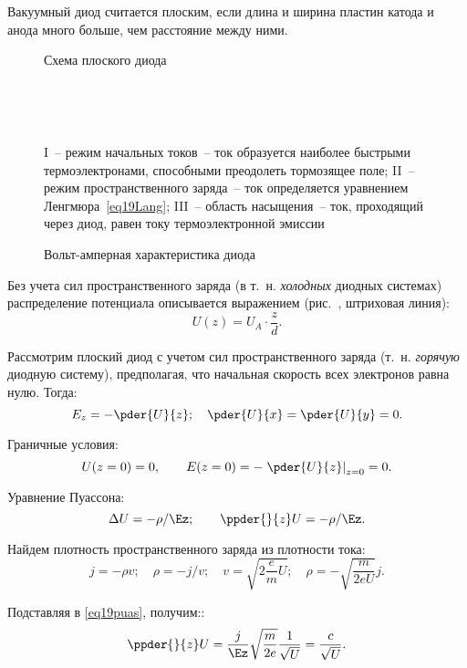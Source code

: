 
Вакуумный диод считается плоским, если длина и ширина пластин катода и анода
много больше, чем расстояние между ними.
\begin{figure}[h!]
  \center
  \parbox{.3\textwidth}{\caption{Схема плоского диода} \label{pic19diode}}
    \hspace{1em}
  \parbox{.45\textwidth}{\caption{Вольт-амперная характеристика диода}
    \label{pic19VAC}} \\
  \parbox{.35\textwidth}{\ } \hspace{1em}
  \parbox{.6\textwidth}{\footnotesize I~-- режим начальных токов~-- ток
    образуется наиболее быстрыми термоэлектронами, способными преодолеть
    тормозящее поле; II~-- режим пространственного заряда~-- ток определяется
    уравнением Ленгмюра~\eqref{eq19Lang}; III~-- область насыщения~-- ток,
    проходящий через диод, равен току термоэлектронной эмиссии}
\end{figure}

Без учета сил пространственного заряда (в т.~н. \emph{холодных} диодных
системах) распределение потенциала описывается выражением (рис.~,
штриховая линия):
\[
  U(z) = U_A \cdot \frac{z}{d}.
\]

Рассмотрим плоский диод с учетом сил пространственного заряда (т.~н.
\emph{горячую} диодную систему), предполагая, что начальная скорость всех
электронов равна нулю. Тогда:
\[
  E_z = -\pder{U}{z}; \quad \pder{U}{x} = \pder{U}{y} = 0.
\]

Граничные условия:
\[
  U(z = 0) = 0, \qquad E(z = 0) = -\left. \pder{U}{z} \right|_{z = 0} = 0.
\]

Уравнение Пуассона:
\begin{equation}
  \D U = -\rho / \Ez; \qquad \ppder{}{z}U = -\rho / \Ez.
  \label{eq19puas}
\end{equation}

Найдем плотность пространственного заряда из плотности тока:
\[
  j = -\rho v; \quad \rho = -j / v; \quad v = \sqrt{2 \frac{e}{m} U}; \quad
    \rho = -\sqrt{\frac{m}{2eU}} j.
\]

Подставляя в \eqref{eq19puas}, получим::
\[
  \ppder{}{z} U = \frac{j}{\Ez} \sqrt{\frac{m}{2e}} \frac{1}{\sqrt{U}} =
    \frac{c}{\sqrt{U}}.
\]

